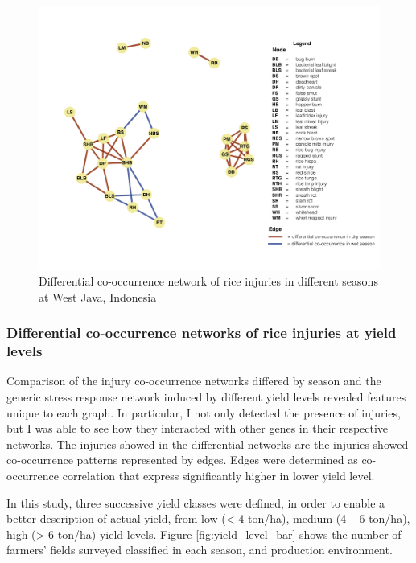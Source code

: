 \begin{figure}
\centering
\includegraphics[width = 1\textwidth]{figures/difseasonWJ.pdf}
\caption{Differential co-occurrence network of rice injuries in different seasons at West Java, Indonesia}
\label{fig:difseasonWJ}
\end{figure}

\subsubsection{Differential co-occurrence networks of rice injuries at yield levels}

Comparison of the injury co-occurrence networks differed by season and the generic stress response network induced by different yield levels revealed features unique to each graph. In particular, I not only detected the presence of injuries, but I was able to see how they interacted with other genes in their respective networks. 
The injuries showed in the differential networks are the injuries showed co-occurrence patterns represented by edges. Edges were determined as co-occurrence correlation that express significantly higher in lower yield level. 

In this study, three successive yield classes were defined, in order to enable a better description of actual yield, from low (< 4 ton/ha), medium (4 – 6 ton/ha),  high (> 6 ton/ha) yield levels. Figure \ref{fig:yield_level_bar} shows the number of farmers’ fields surveyed classified in each season, and production environment.

